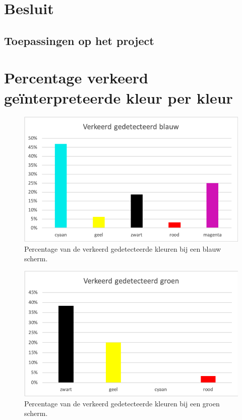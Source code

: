 \documentclass[a4paper,11pt]{article}
\begin{document}
\section{Besluit}\label{sec:besluit}
	
	
	\subsection{Toepassingen op het project}\label{subsec:toepassingen}
		

\newpage
{}



\newpage
\appendix 
\section{Percentage verkeerd geïnterpreteerde kleur per kleur}	
\bigskip	
		\begin{figure} [H]
			\center
			\includegraphics{img/WrongBlue}
			\caption{Percentage van de verkeerd gedetecteerde kleuren bij een blauw scherm.}
		\end{figure}
	\bigskip		
		\begin{figure} [H]
			\center
			\includegraphics{img/WrongGreen}
			\caption{Percentage van de verkeerd gedetecteerde kleuren bij een groen scherm.}
		\end{figure}
\end{document}
